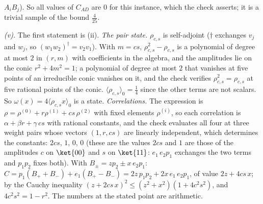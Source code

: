 $A_{i}B_{j}$). So all values of $C_{AD}$ are $0$ for this instance, which the check asserts; it is a trivial sample of the bound $\tfrac{4}{25}$.

\emph{(v).} The first statement is (ii). \emph{The pair state.} $\rho_{c,s}$ is self-adjoint ($\dagger$ exchanges $v_{j}$ and $w_{j}$, so $(w_{1}w_{2})^{\dagger} = v_{2}v_{1}$). With $m = cs$, $\rho_{c,s}^{2} - \rho_{c,s}$ is a polynomial of degree at most $2$ in $(r, m)$ with coefficients in the algebra, and the amplitudes lie on the conic $r^{2} + 4m^{2} = 1$; a polynomial of degree at most $2$ that vanishes at five points of an irreducible conic vanishes on it, and the check verifies $\rho_{c,s}^{2} = \rho_{c,s}$ at five rational points of the conic. $\langle\rho_{c,s}\rangle_{0} = \tfrac14$ since the other terms are not scalars. So $\omega(x) = 4\langle\rho_{c,s}x\rangle_{0}$ is a state. \emph{Correlations.} The expression is $\rho = \rho^{(0)} + r\rho^{(1)} + cs\,\rho^{(2)}$ with fixed elements $\rho^{(i)}$, so each correlation is $\alpha + \beta r + \gamma\,cs$ with rational constants, and the check evaluates all four at three weight pairs whose vectors $(1, r, cs)$ are linearly independent, which determines the constants: $2cs$, $1$, $0$, $0$ (these are the values $2cs$ and $1$ are those of the amplitudes $c$ on $\ket{00}$ and $s$ on $\ket{11}$: $e_{1}\,e_{2}p_{1}$ exchanges the two terms and $p_{1}p_{2}$ fixes both). With $B_{\pm} = zp_{2} \pm x\,e_{2}p_{1}$: $C = p_{1}(B_{+} + B_{-}) + e_{1}(B_{+} - B_{-}) = 2z\,p_{1}p_{2} + 2x\,e_{1}\,e_{2}p_{1}$, of value $2z + 4cs\,x$; by the Cauchy inequality $(z + 2cs\,x)^{2} \le (z^{2} + x^{2})(1 + 4c^{2}s^{2})$, and $4c^{2}s^{2} = 1 - r^{2}$. The numbers at the stated point are arithmetic.
